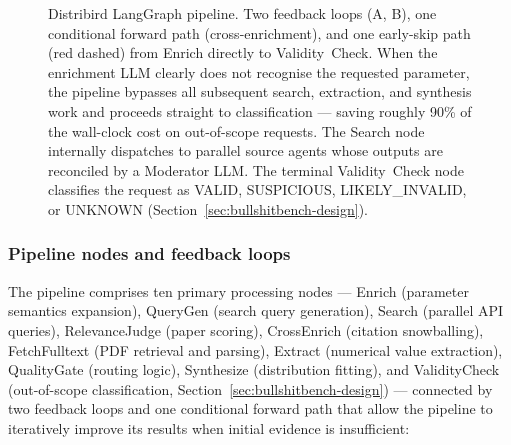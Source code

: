 \documentclass[11pt,a4paper]{article}
\begin{document}
\begin{figure}[!htbp]
\caption{Distribird LangGraph pipeline. Two feedback loops (A, B), one conditional forward path
(cross-enrichment), and one early-skip path (red dashed) from Enrich directly to Validity~Check.
When the enrichment LLM clearly does not recognise the requested parameter, the pipeline bypasses
all subsequent search, extraction, and synthesis work and proceeds straight to classification ---
saving roughly 90\% of the wall-clock cost on out-of-scope requests. The Search node internally
dispatches to parallel source agents whose outputs are reconciled by a Moderator LLM. The terminal
Validity~Check node classifies the request as VALID, SUSPICIOUS, LIKELY\_INVALID, or UNKNOWN
(Section~\ref{sec:bullshitbench-design}).}
\label{fig:pipeline}
\end{figure}

\subsubsection{Pipeline nodes and feedback loops}
\label{sec:feedback}

The pipeline comprises ten primary processing nodes --- Enrich (parameter semantics expansion), QueryGen (search query generation), Search (parallel API queries), RelevanceJudge (paper scoring), CrossEnrich (citation snowballing), FetchFulltext (PDF retrieval and parsing), Extract (numerical value extraction), QualityGate (routing logic), Synthesize (distribution fitting), and ValidityCheck (out-of-scope classification, Section~\ref{sec:bullshitbench-design}) --- connected by two feedback loops and one conditional forward path that allow the pipeline to iteratively improve its results when initial evidence is insufficient:
\end{document}
